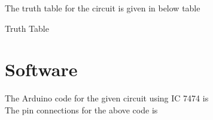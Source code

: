 \documentclass{article}
\begin{document}
 The truth table for the circuit is given in below table \\
 \begin{table}[h]
  \begin{center}
 
  \caption{Truth Table}
  \label{table:2}
  \end{center}
 \end{table}

\section{Software}
 The Arduino code for the given circuit using IC 7474 is \\
 
 The pin connections for the above code is
 
\end{document}
